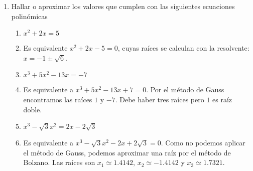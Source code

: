 \documentclass[a4paper]{article}
\newcommand{\answer}{\item[**]}
\newcommand{\exercise}{\item}
\begin{document}
\begin{enumerate}
\begin{multicols}{2}
\begin{enumerate} [label=(\alph*)]
		\item $x^7+18x^6+81x^5$
		\answer \href{https://youtu.be/Z1KatpJM2eU}{Resolución}

		\item $x^4-2x^2+2$
		\answer Sustituimos $y=x^2$ yel polinomio queda como $y^2+2y-2$, al que le calculamos las raices con la resolvente. Obtenemos la raíz doble $y=1$, de la que obtenemos las raíces $x=\pm1$. Por lo tanto el polinomio factorizado es: $(x-1)^2(x+1)^2$. 

		\item $x^6-x^4-20x^2$
		\answer Sacamos factor común y obtenemos el polinomio $x^2(x^4-x^2-20)$. Para buscar las raíces restantes realizamos la sustitución $t^2$ y el polinomio resultante es $t(t^2-t-20)$. Con la resolvente obtenemos los valores de $t=5$, del que obtenemos $x=\pm \sqrt{5}$, y $t=-4$, del que obtenemos $x=\pm2i$. Finalmenta la factorización compleja queda como: $x^2(x-\sqrt{5})(x+\sqrt{5})(x-2i)(x+2i)$. Y la factorización real queda como $x^2(x-\sqrt{5})(x+\sqrt{5})(x^+4)$.
		
		\item $x^7-x$
		\answer \href{https://youtu.be/EQIEmdkGOZE}{Resolución}

		\item $x^6+3x^3-4$
		\answer \href{https://youtu.be/BCo0pxE288w}{Resolución}

	\end{enumerate}
	\end{multicols}


	\exercise Hallar o aproximar los valores que cumplen con las siguientes ecuaciones polinómicas 

	\begin{multicols}{2}
	\begin{enumerate} [label=(\alph*)]
		
		\item $x^2+2x=5$
		\answer Es equivalente $x^2+2x-5=0$, cuyas raíces se calculan con la resolvente: $x=-1\pm\sqrt{6}$.

		\item $x^3+5x^2-13x = -7$
		\answer Es equivalente a $x^3+5x^2-13x +7 =0$. Por el método de Gauss encontramos las raíces $1$ y $-7$. Debe haber tres raíces pero $1$ es raíz doble.

		\item $x^3 -\sqrt{3}x^2 = 2x - 2\sqrt{3}$
		\answer Es equivalente a $x^3 -\sqrt{3}x^2 - 2x + 2\sqrt{3} = 0$. Como no podemos aplicar el método de Gauss, podemos aproximar una raíz por el método de Bolzano. Las raíces son $x_1 \simeq 1.4142$, $x_2 \simeq -1.4142$ y $x_3 \simeq 1.7321$.


\end{enumerate}
\end{multicols}
\end{enumerate}
\end{document}
